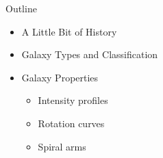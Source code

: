 \documentclass[letterpaper,landscape]{slides}
\begin{document}

\begin{slide}
\begin{center}
{\large \color{red} 
                         Outline
}
\end{center}

\begin{itemize}
\item {\color{blue} A Little Bit of History}
\item {\color{blue} Galaxy Types and Classification}
\item {\color{blue} Galaxy Properties}
\begin{itemize}
\item Intensity profiles
\item Rotation curves 
\item Spiral arms 
\end{itemize}          
\end{itemize}          

\vfill
\end{slide}


\end{document}
